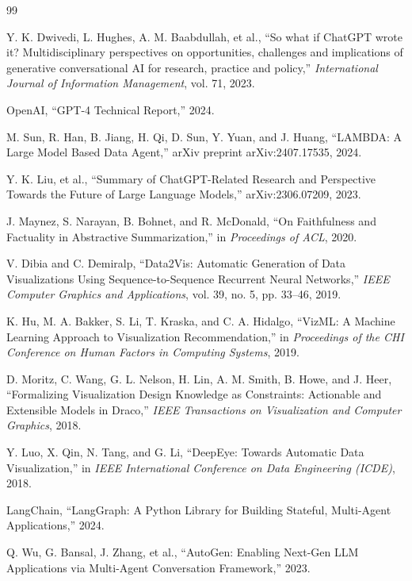 \documentclass[12pt,a4paper,openany]{report}
\begin{document}
\clearpage
{}
{}
\begin{thebibliography}{99}

 Y. K. Dwivedi, L. Hughes, A. M. Baabdullah, et al., ``So what if ChatGPT wrote it? Multidisciplinary perspectives on opportunities, challenges and implications of generative conversational AI for research, practice and policy,'' \textit{International Journal of Information Management}, vol. 71, 2023.

 OpenAI, ``GPT-4 Technical Report,'' 2024.

 M. Sun, R. Han, B. Jiang, H. Qi, D. Sun, Y. Yuan, and J. Huang, ``LAMBDA: A Large Model Based Data Agent,'' arXiv preprint arXiv:2407.17535, 2024.

 Y. K. Liu, et al., ``Summary of ChatGPT-Related Research and Perspective Towards the Future of Large Language Models,'' arXiv:2306.07209, 2023.

 J. Maynez, S. Narayan, B. Bohnet, and R. McDonald, ``On Faithfulness and Factuality in Abstractive Summarization,'' in \textit{Proceedings of ACL}, 2020.

 V. Dibia and C. Demiralp, ``Data2Vis: Automatic Generation of Data Visualizations Using Sequence-to-Sequence Recurrent Neural Networks,'' \textit{IEEE Computer Graphics and Applications}, vol. 39, no. 5, pp. 33--46, 2019.

 K. Hu, M. A. Bakker, S. Li, T. Kraska, and C. A. Hidalgo, ``VizML: A Machine Learning Approach to Visualization Recommendation,'' in \textit{Proceedings of the CHI Conference on Human Factors in Computing Systems}, 2019.

 D. Moritz, C. Wang, G. L. Nelson, H. Lin, A. M. Smith, B. Howe, and J. Heer, ``Formalizing Visualization Design Knowledge as Constraints: Actionable and Extensible Models in Draco,'' \textit{IEEE Transactions on Visualization and Computer Graphics}, 2018.

 Y. Luo, X. Qin, N. Tang, and G. Li, ``DeepEye: Towards Automatic Data Visualization,'' in \textit{IEEE International Conference on Data Engineering (ICDE)}, 2018.

 LangChain, ``LangGraph: A Python Library for Building Stateful, Multi-Agent Applications,'' 2024.

 Q. Wu, G. Bansal, J. Zhang, et al., ``AutoGen: Enabling Next-Gen LLM Applications via Multi-Agent Conversation Framework,'' 2023.


\end{thebibliography}
\end{document}
